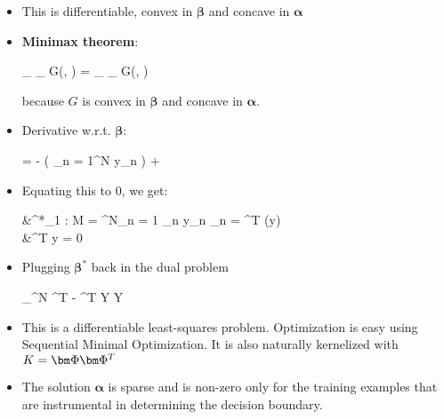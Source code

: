 \begin{itemize}
\begin{itemize}
\begin{myalign*}
		\end{myalign*}
		\item This is differentiable, convex in $\bm \beta$ and concave in $\bm \alpha$
		\item \textbf{Minimax theorem}: 
		\begin{myalign*}
		    \min_{\bm \beta} \max_{\bm \alpha} G(\bm \beta, \bm \alpha) = \max_{\bm \alpha} \min_{\bm \beta} G(\bm \beta, \bm \alpha)
		\end{myalign*}
		because $G$ is convex in $\bm \beta$ and concave in $\bm \alpha$.
		\item Derivative w.r.t. $\bm \beta$:
		\begin{myalign*}
		     = - 
		    \left(
		    	\sum_{n = 1}^N \alpha y_n \tilde{\phi_n}
		    \right)
		    + 
		\end{myalign*}
		\item Equating this to 0, we get:
			\begin{myalign*}
			    &\bm \beta^*_{1 : M} = \sum^N_{n = 1} \alpha_n y_n \phi_n = \bm \Phi^T (\*y) \bm \alpha\\
			    &\bm \alpha^T \*y = 0
			\end{myalign*}
		\item Plugging $\bm \beta^*$ back in the dual problem
		\begin{myalign*}
		    \max_{\bm \alpha \in [0, C]^N} \bm \alpha^T  -  \bm \alpha^T \*Y \bm \Phi \bm \Phi \* Y \bm \alpha
		\end{myalign*}
		\item This is a differentiable least-squares problem. Optimization is easy using Sequential Minimal Optimization. It is also naturally kernelized with $\*K = \bm \Phi \bm \Phi^T$
		\item The solution $\bm \alpha$ is sparse and is non-zero only for the training examples that are instrumental in determining the decision boundary.
	\end{itemize}
\end{itemize}


